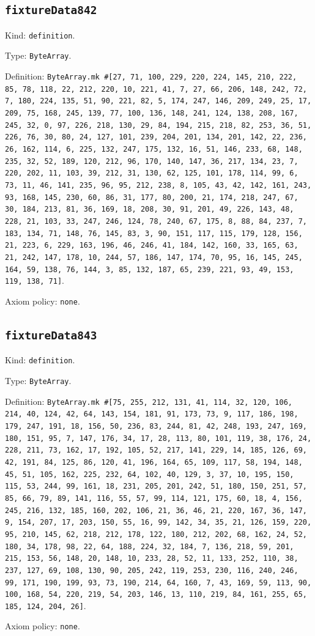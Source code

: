 \documentclass[11pt]{article}
\begin{document}
\subsection*{\texttt{fixtureData842}}
\noindent Kind: \texttt{definition}.\par
\noindent Type: \texttt{ByteArray}.\par
\noindent Definition: \texttt{ByteArray.mk \#[27, 71, 100, 229, 220, 224, 145, 210, 222, 85, 78, 118, 22, 212, 220, 10, 221, 41, 7, 27, 66, 206, 148, 242, 72, 7, 180, 224, 135, 51, 90, 221, 82, 5, 174, 247, 146, 209, 249, 25, 17, 209, 75, 168, 245, 139, 77, 100, 136, 148, 241, 124, 138, 208, 167, 245, 32, 0, 97, 226, 218, 130, 29, 84, 194, 215, 218, 82, 253, 36, 51, 226, 76, 30, 80, 24, 127, 101, 239, 204, 201, 134, 201, 142, 22, 236, 26, 162, 114, 6, 225, 132, 247, 175, 132, 16, 51, 146, 233, 68, 148, 235, 32, 52, 189, 120, 212, 96, 170, 140, 147, 36, 217, 134, 23, 7, 220, 202, 11, 103, 39, 212, 31, 130, 62, 125, 101, 178, 114, 99, 6, 73, 11, 46, 141, 235, 96, 95, 212, 238, 8, 105, 43, 42, 142, 161, 243, 93, 168, 145, 230, 60, 86, 31, 177, 80, 200, 21, 174, 218, 247, 67, 30, 184, 213, 81, 36, 169, 18, 208, 30, 91, 201, 49, 226, 143, 48, 228, 21, 103, 33, 247, 246, 124, 78, 240, 67, 175, 8, 88, 84, 237, 7, 183, 134, 71, 148, 76, 145, 83, 3, 90, 151, 117, 115, 179, 128, 156, 21, 223, 6, 229, 163, 196, 46, 246, 41, 184, 142, 160, 33, 165, 63, 21, 242, 147, 178, 10, 244, 57, 186, 147, 174, 70, 95, 16, 145, 245, 164, 59, 138, 76, 144, 3, 85, 132, 187, 65, 239, 221, 93, 49, 153, 119, 138, 71]}.\par
\noindent Axiom policy: \texttt{none}.\par
\subsection*{\texttt{fixtureData843}}
\noindent Kind: \texttt{definition}.\par
\noindent Type: \texttt{ByteArray}.\par
\noindent Definition: \texttt{ByteArray.mk \#[75, 255, 212, 131, 41, 114, 32, 120, 106, 214, 40, 124, 42, 64, 143, 154, 181, 91, 173, 73, 9, 117, 186, 198, 179, 247, 191, 18, 156, 50, 236, 83, 244, 81, 42, 248, 193, 247, 169, 180, 151, 95, 7, 147, 176, 34, 17, 28, 113, 80, 101, 119, 38, 176, 24, 228, 211, 73, 162, 17, 192, 105, 52, 217, 141, 229, 14, 185, 126, 69, 42, 191, 84, 125, 86, 120, 41, 196, 164, 65, 109, 117, 58, 194, 148, 45, 51, 105, 162, 225, 232, 64, 102, 40, 129, 3, 37, 10, 195, 150, 115, 53, 244, 99, 161, 18, 231, 205, 201, 242, 51, 180, 150, 251, 57, 85, 66, 79, 89, 141, 116, 55, 57, 99, 114, 121, 175, 60, 18, 4, 156, 245, 216, 132, 185, 160, 202, 106, 21, 36, 46, 21, 220, 167, 36, 147, 9, 154, 207, 17, 203, 150, 55, 16, 99, 142, 34, 35, 21, 126, 159, 220, 95, 210, 145, 62, 218, 212, 178, 122, 180, 212, 202, 68, 162, 24, 52, 180, 34, 178, 98, 22, 64, 188, 224, 32, 184, 7, 136, 218, 59, 201, 215, 153, 56, 148, 20, 148, 10, 233, 28, 52, 11, 133, 252, 110, 38, 237, 127, 69, 108, 130, 90, 205, 242, 119, 253, 230, 116, 240, 246, 99, 171, 190, 199, 93, 73, 190, 214, 64, 160, 7, 43, 169, 59, 113, 90, 100, 168, 54, 220, 219, 54, 203, 146, 13, 110, 219, 84, 161, 255, 65, 185, 124, 204, 26]}.\par
\noindent Axiom policy: \texttt{none}.\par
\end{document}
